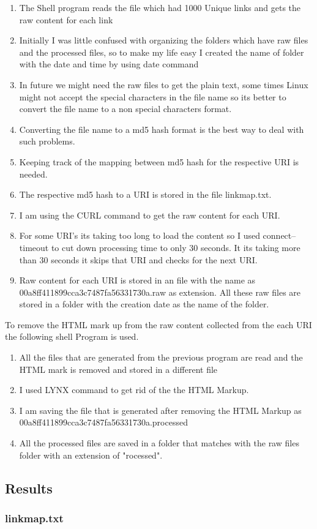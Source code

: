 \begin{enumerate}

\item The Shell program reads the file which had 1000 Unique links and gets the raw content for each link
\item Initially I was little confused with organizing the folders which have raw files and the processed files, so to make my life easy I created the name of folder with the date and time by using date command
\item In future we might need the raw files to get the plain text, some times Linux might not accept the special characters in the file name so its better to convert the file name to a non special characters format. 
\item Converting the file name to a md5 hash format is the best way to deal with such problems. 
\item Keeping track of the mapping between md5 hash for the respective URI is  needed.
\item The respective md5 hash to a URI is stored in the file linkmap.txt.
\item I am using the CURL command to get the raw content for each URI. 
\item For some URI's its taking too long to load the content so I used connect--timeout to cut down processing time to only 30 seconds. It its taking more than 30 seconds it skips that URI and checks for the next URI. 
\item Raw content for each URI is stored in an file with the name as 00a8ff411899cca3c7487fa56331730a.raw as extension. All these raw files are stored in a folder with the creation date as the name of the folder.

\end{enumerate}
\newpage
To remove the HTML mark up from the raw content collected from the each URI the following shell Program is used. 



\begin{enumerate}
\item All the files that are generated from the previous program are read and the HTML mark is removed and stored in a different file
\item I used LYNX command to get rid of the the HTML Markup. 
\item I am saving the file that is generated after removing the HTML Markup as \newline 00a8ff411899cca3c7487fa56331730a.processed
\item All the processed files are saved in a folder that matches with the raw files folder with an extension of "rocessed".
\end{enumerate}
\subsection{Results}
\subsubsection{linkmap.txt}






